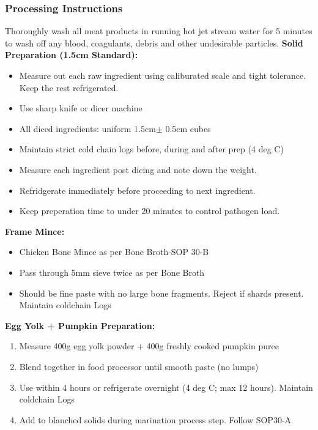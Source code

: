 \subsubsection*{Processing Instructions}
\item Thoroughly wash all meat products in running hot jet stream water for 5 minutes to wash off any blood, coagulants, debris and other undesirable particles. 
\textbf{Solid Preparation (1.5cm Standard):}
\begin{itemize}
\item Measure out each raw ingredient using caliburated scale and tight tolerance. Keep the rest refrigerated.
\item Use sharp knife or dicer machine
\item All diced ingredients: uniform 1.5cm$\pm$ 0.5cm cubes
\item Maintain strict cold chain logs before, during and after prep (4 deg C)
\item Measure each ingredient post dicing and note down the weight. 
\item Refridgerate immediately before proceeding to next ingredient. 
\item Keep preperation time to under 20 minutes to control pathogen load. 
\end{itemize}

\textbf{Frame Mince:}
\begin{itemize}
\item Chicken Bone Mince as per Bone Broth-SOP 30-B
\item Pass through 5mm sieve twice as per Bone Broth 
\item Should be fine paste with no large bone fragments. Reject if shards present. Maintain coldchain Logs
\end{itemize}
\textbf{Egg Yolk + Pumpkin Preparation:}
\begin{enumerate}
\item Measure 400g egg yolk powder + 400g freshly cooked pumpkin puree
\item Blend together in food processor until smooth paste (no lumps)
\item Use within 4 hours or refrigerate overnight (4 deg C; max 12 hours). Maintain coldchain Logs
\item Add to blanched solids during marination process step. Follow SOP30-A
\end{enumerate}

